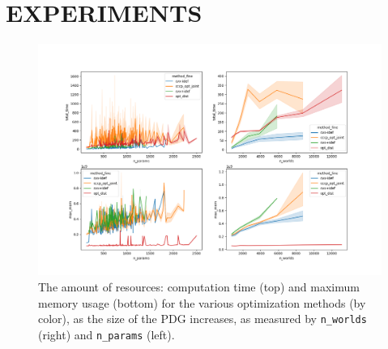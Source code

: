 \documentclass[twoside]{article}
\begin{document}
% 
% 
\section{EXPERIMENTS} \label{sec:expts}

\begin{figure}
    \includegraphics[width=\linewidth]{figs/resources-fine}
    \caption{
        The amount of resources: computation time (top) and maximum memory usage (bottom) for the various optimization methods (by color), as the size of the PDG increases, as measured by \texttt{n\_worlds} (right) and \texttt{n\_params} (left).
     }\label{fig:resources}
\end{figure}
\end{document}
